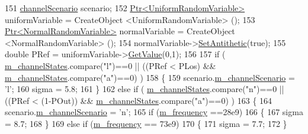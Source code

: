 \begin{DoxyCode}
151                         \hyperlink{structchannelScenario}{channelScenario} scenario;
152                         \hyperlink{classns3_1_1Ptr}{Ptr<UniformRandomVariable>} uniformVariable = CreateObject
       <UniformRandomVariable> ();
153                         \hyperlink{classns3_1_1Ptr}{Ptr<NormalRandomVariable>} normalVariable = CreateObject
       <NormalRandomVariable> ();
154                         normalVariable->\hyperlink{classns3_1_1RandomVariableStream_ab27522a091c67b9e38c9b4716a1c1c5c}{SetAntithetic}(\textcolor{keyword}{true});
155                         \textcolor{keywordtype}{double} PRef = uniformVariable->\hyperlink{classns3_1_1UniformRandomVariable_a03822d8c86ac51e9aa83bbc73041386b}{GetValue}(0,1);
156 
157                         \textcolor{keywordflow}{if} ( \hyperlink{classMmWavePropagationLossModel_a81e39f0546fa8b255b69fecc8cea09a0}{m\_channelStates}.compare(\textcolor{stringliteral}{"l"})==0 || ((PRef < PLos) && 
      \hyperlink{classMmWavePropagationLossModel_a81e39f0546fa8b255b69fecc8cea09a0}{m\_channelStates}.compare(\textcolor{stringliteral}{"a"})==0) )
158                         \{
159                                 scenario.\hyperlink{structchannelScenario_adba9eb89f9bb89e643f8e254f0c84ca2}{m\_channelScenario} = \textcolor{charliteral}{'l'};
160                                 sigma = 5.8;
161                         \}
162                         \textcolor{keywordflow}{else} \textcolor{keywordflow}{if} ( \hyperlink{classMmWavePropagationLossModel_a81e39f0546fa8b255b69fecc8cea09a0}{m\_channelStates}.compare(\textcolor{stringliteral}{"n"})==0 || ((PRef < (1-POut)) && 
      \hyperlink{classMmWavePropagationLossModel_a81e39f0546fa8b255b69fecc8cea09a0}{m\_channelStates}.compare(\textcolor{stringliteral}{"a"})==0) )
163                         \{
164                                 scenario.\hyperlink{structchannelScenario_adba9eb89f9bb89e643f8e254f0c84ca2}{m\_channelScenario} = \textcolor{charliteral}{'n'};
165                                 \textcolor{keywordflow}{if} (\hyperlink{classMmWavePropagationLossModel_ab13f20e31b1a3f9dddcf3cad2f75b2d9}{m\_frequency} ==28e9)
166                                 \{
167                                         sigma = 8.7;
168                                 \}
169                                 \textcolor{keywordflow}{else} \textcolor{keywordflow}{if} (\hyperlink{classMmWavePropagationLossModel_ab13f20e31b1a3f9dddcf3cad2f75b2d9}{m\_frequency} == 73e9)
170                                 \{
171                                         sigma = 7.7;
172                                 \}

\end{DoxyCode}
